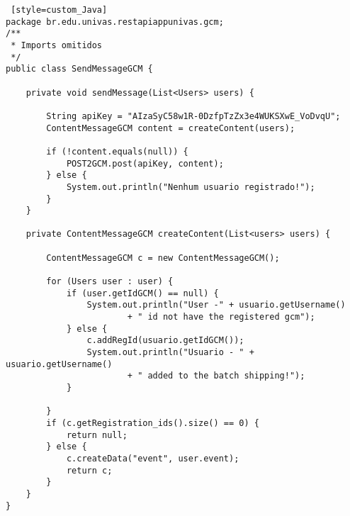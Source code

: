 \begin{lstlisting} [style=custom_Java]
package br.edu.univas.restapiappunivas.gcm;
/**
 * Imports omitidos
 */
public class SendMessageGCM {

	private void sendMessage(List<Users> users) {

		String apiKey = "AIzaSyC58w1R-0DzfpTzZx3e4WUKSXwE_VoDvqU";
		ContentMessageGCM content = createContent(users);
		
		if (!content.equals(null)) {
			POST2GCM.post(apiKey, content);
		} else {
			System.out.println("Nenhum usuario registrado!");
		}
	}
	
	private ContentMessageGCM createContent(List<users> users) {

		ContentMessageGCM c = new ContentMessageGCM();

		for (Users user : user) {
			if (user.getIdGCM() == null) {
				System.out.println("User -" + usuario.getUsername()
						+ " id not have the registered gcm");
			} else {
				c.addRegId(usuario.getIdGCM());
				System.out.println("Usuario - " + usuario.getUsername()
						+ " added to the batch shipping!");
			}

		}
		if (c.getRegistration_ids().size() == 0) {
			return null;
		} else {
			c.createData("event", user.event);
			return c;
		}
	}
}


	
\end{lstlisting}
